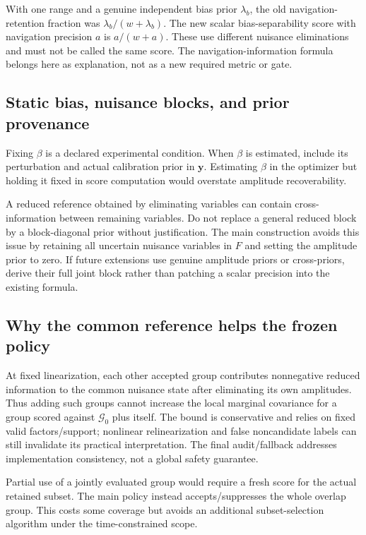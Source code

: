 \documentclass[conference]{IEEEtran}%
\begin{document}
With one range and a genuine independent bias prior $\lambda_b$, the old navigation-retention fraction was $\lambda_b/(w+\lambda_b)$. The new scalar bias-separability score with navigation precision $a$ is $a/(w+a)$. These use different nuisance eliminations and must not be called the same score. The navigation-information formula belongs here as explanation, not as a new required metric or gate.

\subsection{Static bias, nuisance blocks, and prior provenance}
Fixing $\beta$ is a declared experimental condition. When $\beta$ is estimated, include its perturbation and actual calibration prior in $\mathbf y$. Estimating $\beta$ in the optimizer but holding it fixed in score computation would overstate amplitude recoverability.

A reduced reference obtained by eliminating variables can contain cross-information between remaining variables. Do not replace a general reduced block by a block-diagonal prior without justification. The main construction avoids this issue by retaining all uncertain nuisance variables in $F$ and setting the amplitude prior to zero. If future extensions use genuine amplitude priors or cross-priors, derive their full joint block rather than patching a scalar precision into the existing formula.

\subsection{Why the common reference helps the frozen policy}
At fixed linearization, each other accepted group contributes nonnegative reduced information to the common nuisance state after eliminating its own amplitudes. Thus adding such groups cannot increase the local marginal covariance for a group scored against $\mathcal G_0$ plus itself. The bound is conservative and relies on fixed valid factors/support; nonlinear relinearization and false noncandidate labels can still invalidate its practical interpretation. The final audit/fallback addresses implementation consistency, not a global safety guarantee.

Partial use of a jointly evaluated group would require a fresh score for the actual retained subset. The main policy instead accepts/suppresses the whole overlap group. This costs some coverage but avoids an additional subset-selection algorithm under the time-constrained scope.
\end{document}
